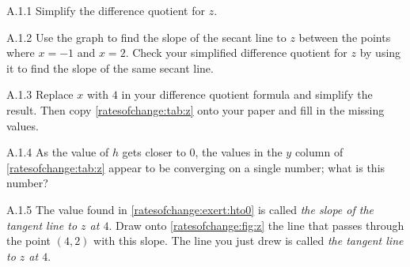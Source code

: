 \begin{Question}{A.1.1}
Simplify the difference quotient for $z$.
\end{Question}
\begin{Question}{A.1.2}
Use the graph to find the slope of the secant line to $z$ between the points where $x=-1$ and $x=2$. Check your simplified difference quotient for $z$ by using it to find the slope of the same secant line.
\end{Question}
\begin{Question}{A.1.3}
Replace $x$ with $4$ in your difference quotient formula and simplify the result. Then copy \cref{ratesofchange:tab:z} onto your paper and fill in the missing values.
\end{Question}
\begin{Question}{A.1.4}
\label{ratesofchange:exert:hto0} As the value of $h$ gets closer to $0$, the values in the $y$ column of \cref{ratesofchange:tab:z} appear to be converging on a single number; what is this number?
\end{Question}
\begin{Question}{A.1.5}
The value found in \cref{ratesofchange:exert:hto0} is called \emph{the slope of the tangent line to $z$ at $4$}. Draw onto \cref{ratesofchange:fig:z} the line that passes through the point $(4,2)$ with this slope. The line you just drew is called \emph{the tangent line to $z$ at $4$}.
\end{Question}
